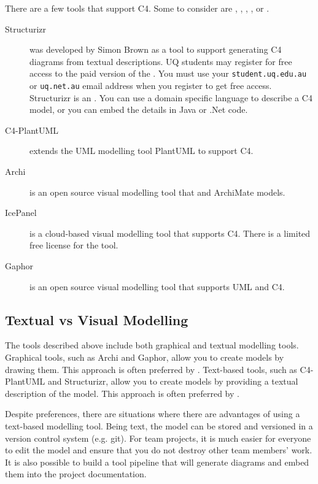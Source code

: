 There are a few tools that support C4. Some to consider are ,
, ,
, or .

\begin{description}
    \item[Structurizr]
        was developed by Simon Brown as a tool to support generating C4 diagrams from textual descriptions.
        UQ students may register for free access to the paid version of the .
        You must use your \texttt{student.uq.edu.au} or \texttt{uq.net.au} email address when you register to get free access.
        Structurizr is an .
        You can use a domain specific language to describe a C4 model, or you can embed the details in Java or .Net code.
    \item[C4-PlantUML] extends the UML modelling tool PlantUML to support C4.
    \item[Archi] is an open source visual modelling tool that
         and ArchiMate models.
    \item[IcePanel] is a cloud-based visual modelling tool that supports C4. There is a limited free license for the tool.
    \item[Gaphor] is an open source visual modelling tool that supports UML and C4.
\end{description}

\subsection{Textual vs Visual Modelling}
The tools described above include both graphical and textual modelling tools.
Graphical tools, such as Archi and Gaphor, allow you to create models by drawing them.
This approach is often preferred by .
Text-based tools, such as C4-PlantUML and Structurizr, allow you to create models by providing a textual description of the model.
This approach is often preferred by .

Despite preferences, there are situations where there are advantages of using a text-based modelling tool.
Being text, the model can be stored and versioned in a version control system (e.g. git).
For team projects, it is much easier for everyone to edit the model and ensure that you do not destroy other team members' work.
It is also possible to build a tool pipeline that will generate diagrams and embed them into the project documentation.

